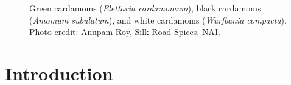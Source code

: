 \documentclass[12pt]{article}
\begin{document}



\begin{figure}[!ht]
	\vspace{-2ex}
	\centering
	\hfill
	\hfill
	\caption{Green cardamoms (\textit{Elettaria cardamomum}), black cardamoms (\textit{Amomum subulatum}), and white cardamoms (\textit{Wurfbania compacta}). Photo credit: \href{https://pixabay.com/photos/green-cardamom-aroma-cardamom-asian-8140138/}{Anupam Roy}, \href{https://silkroadspices.ca/products/cardamom-black}{Silk Road Spices}, \href{https://nai4trade.com/spices/}{NAI}.}
	\label{fig:cardamoms}
\end{figure}


\section{Introduction}
\end{document}
